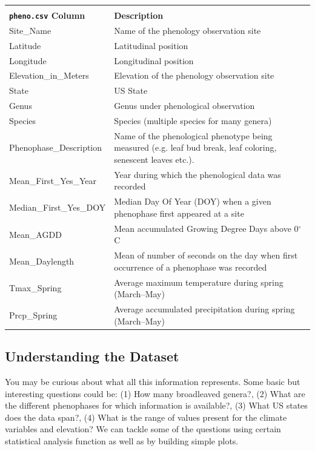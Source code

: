\documentclass[11pt,twosided]{article}
\begin{document}
\begin{table}[!h]
\begin{tabular}{l p{4.5in}}
\toprule\\[1ex]
{\bf {\tt pheno.csv} Column}		&	{\bf Description}\\[1.5ex]
\midrule
Site\_Name		&	Name of the phenology observation site \\[2ex]
Latitude		&	Latitudinal position \\[2ex]
Longitude		&	Longitudinal position \\[2ex]
Elevation\_in\_Meters	&	Elevation of the phenology observation site \\[2ex]
State			&	US State \\[2ex]
Genus			&	Genus under phenological observation \\[2ex]
Species			&	Species (multiple species for many genera) \\[2ex]
Phenophase\_Description	&	Name of the phenological phenotype being measured (e.g. leaf bud break, leaf coloring, senescent leaves etc.). \\[2ex]
Mean\_First\_Yes\_Year	&	Year during which the phenological data was recorded \\[2ex]
Median\_First\_Yes\_DOY	&	Median Day Of Year (DOY) when a given phenophase first appeared at a site \\[2ex]
Mean\_AGDD		&	Mean accumulated Growing Degree Days above 0$^{\circ}$C \\[2ex]
Mean\_Daylength		&	Mean of number of seconds on the day when first occurrence of a phenophase was recorded \\[2ex]
Tmax\_Spring		&	Average maximum temperature during spring (March--May)\\[2ex]
Prcp\_Spring		&	Average accumulated precipitation during spring (March--May) \\[2ex]
\bottomrule
\end{tabular}
\end{table}

\subsection{Understanding the Dataset}
You may be curious about what all this information represents.  Some basic but interesting questions could be: (1) How many broadleaved genera?, (2) What are the different phenophases for which information is available?, (3) What US states does the data span?, (4) What is the range of values present for the climate variables and elevation?  We can tackle some of the questions using certain statistical analysis function as well as by building simple plots.\\
\end{document}
